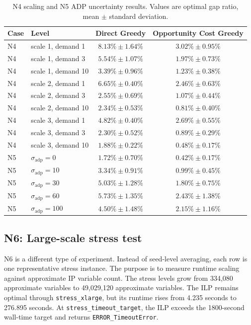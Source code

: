 \documentclass[10pt,a4paper]{article}
\begin{document}
\begin{table}[H]
\centering
\small
\setlength{\tabcolsep}{4pt}
\caption{N4 scaling and N5 ADP uncertainty results. Values are optimal gap ratio, mean $\pm$ standard deviation.}
\label{tab:n4_n5}
\begin{tabular}{llcc}
\toprule
Case & Level & Direct Greedy & Opportunity Cost Greedy \\
\midrule
N4 & scale 1, demand 1 & $8.13\% \pm 1.64\%$ & $3.02\% \pm 0.95\%$ \\
N4 & scale 1, demand 3 & $5.54\% \pm 1.07\%$ & $1.97\% \pm 0.73\%$ \\
N4 & scale 1, demand 10 & $3.39\% \pm 0.96\%$ & $1.23\% \pm 0.38\%$ \\
N4 & scale 2, demand 1 & $6.65\% \pm 0.40\%$ & $2.46\% \pm 0.63\%$ \\
N4 & scale 2, demand 3 & $2.55\% \pm 0.69\%$ & $1.07\% \pm 0.44\%$ \\
N4 & scale 2, demand 10 & $2.34\% \pm 0.53\%$ & $0.81\% \pm 0.40\%$ \\
N4 & scale 3, demand 1 & $4.82\% \pm 0.40\%$ & $2.69\% \pm 0.55\%$ \\
N4 & scale 3, demand 3 & $2.30\% \pm 0.52\%$ & $0.89\% \pm 0.29\%$ \\
N4 & scale 3, demand 10 & $1.88\% \pm 0.22\%$ & $0.48\% \pm 0.17\%$ \\
\midrule
N5 & $\sigma_{\text{adp}}=0$ & $1.72\% \pm 0.70\%$ & $0.42\% \pm 0.17\%$ \\
N5 & $\sigma_{\text{adp}}=10$ & $3.34\% \pm 0.91\%$ & $0.99\% \pm 0.45\%$ \\
N5 & $\sigma_{\text{adp}}=30$ & $5.03\% \pm 1.28\%$ & $1.80\% \pm 0.75\%$ \\
N5 & $\sigma_{\text{adp}}=60$ & $5.73\% \pm 1.35\%$ & $2.43\% \pm 1.38\%$ \\
N5 & $\sigma_{\text{adp}}=100$ & $4.50\% \pm 1.48\%$ & $2.15\% \pm 1.16\%$ \\
\bottomrule
\end{tabular}
\end{table}

\subsection{N6: Large-scale stress test}

N6 is a different type of experiment. Instead of seed-level averaging, each row is one representative stress instance. The purpose is to measure runtime scaling against approximate IP variable count. The stress levels grow from 334,080 approximate variables to 49,029,120 approximate variables. The ILP remains optimal through \texttt{stress\_xlarge}, but its runtime rises from 4.235 seconds to 276.895 seconds. At \texttt{stress\_timeout\_target}, the ILP exceeds the 1800-second wall-time target and returns \texttt{ERROR\_TimeoutError}.
\end{document}
